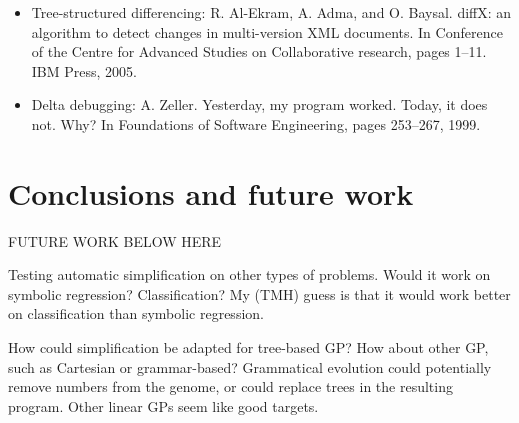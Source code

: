 \begin{itemize}
\item
Tree-structured differencing: R. Al-Ekram, A. Adma, and O. Baysal. diffX: an algorithm to detect changes in multi-version XML documents. In Conference of the Centre for Advanced Studies on Collaborative research, pages 1–11. IBM Press, 2005.

\item
Delta debugging: A. Zeller. Yesterday, my program worked. Today, it does not. Why? In Foundations of Software Engineering, pages 253–267, 1999.

\end{itemize}

\section{Conclusions and future work}
\label{sec:conclusions}


FUTURE WORK BELOW HERE

Testing automatic simplification on other types of problems. Would it work on symbolic regression? Classification? My (TMH) guess is that it would work better on classification than symbolic regression.

How could simplification be adapted for tree-based GP? How about other GP, such as Cartesian or grammar-based? Grammatical evolution could potentially remove numbers from the genome, or could replace trees in the resulting program. Other linear GPs seem like good targets.

\begin{acks}
  

\end{acks}
